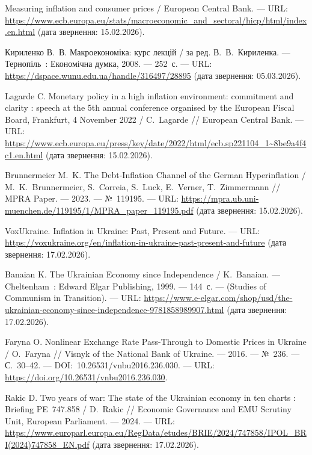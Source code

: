 \documentclass{bachelor_thesis}
\begin{document}
\begin{enumerate}[label={[\arabic*]}, leftmargin=0pt, itemindent=0pt, labelindent=0pt]

\item Measuring inflation and consumer prices / European Central Bank. --- URL: \url{https://www.ecb.europa.eu/stats/macroeconomic_and_sectoral/hicp/html/index.en.html} (дата звернення: 15.02.2026).

\item Кириленко В.~В. Макроекономіка: курс лекцій / за ред. В.~В.~Кириленка. --- Тернопіль~: Економічна думка, 2008. --- 252~с. --- URL: \url{https://dspace.wunu.edu.ua/handle/316497/28895} (дата звернення: 05.03.2026).

\item Lagarde C. Monetary policy in a high inflation environment: commitment and clarity : speech at the 5th annual conference organised by the European Fiscal Board, Frankfurt, 4 November 2022 / C.~Lagarde // European Central Bank. --- URL: \url{https://www.ecb.europa.eu/press/key/date/2022/html/ecb.sp221104_1~8be9a4f4c1.en.html} (дата звернення: 15.02.2026).

\item Brunnermeier M.~K. The Debt-Inflation Channel of the German Hyperinflation / M.~K.~Brunnermeier, S.~Correia, S.~Luck, E.~Verner, T.~Zimmermann // MPRA Paper. --- 2023. --- №~119195. --- URL: \url{https://mpra.ub.uni-muenchen.de/119195/1/MPRA_paper_119195.pdf} (дата звернення: 15.02.2026).

\item VoxUkraine. Inflation in Ukraine: Past, Present and Future. --- URL: \url{https://voxukraine.org/en/inflation-in-ukraine-past-present-and-future} (дата звернення: 17.02.2026).

\item Banaian K. The Ukrainian Economy since Independence / K.~Banaian. --- Cheltenham~: Edward Elgar Publishing, 1999. --- 144~с. --- (Studies of Communism in Transition). --- URL: \url{https://www.e-elgar.com/shop/usd/the-ukrainian-economy-since-independence-9781858989907.html} (дата звернення: 17.02.2026).

\item Faryna O. Nonlinear Exchange Rate Pass-Through to Domestic Prices in Ukraine / O.~Faryna // Visnyk of the National Bank of Ukraine. --- 2016. --- №~236. --- С.~30--42. --- DOI:~10.26531/vnbu2016.236.030. --- URL: \url{https://doi.org/10.26531/vnbu2016.236.030}.

\item Rakic D. Two years of war: The state of the Ukrainian economy in ten charts : Briefing PE~747.858 / D.~Rakic // Economic Governance and EMU Scrutiny Unit, European Parliament. --- 2024. --- URL: \url{https://www.europarl.europa.eu/RegData/etudes/BRIE/2024/747858/IPOL_BRI(2024)747858_EN.pdf} (дата звернення: 17.02.2026).


\end{enumerate}
\end{document}
